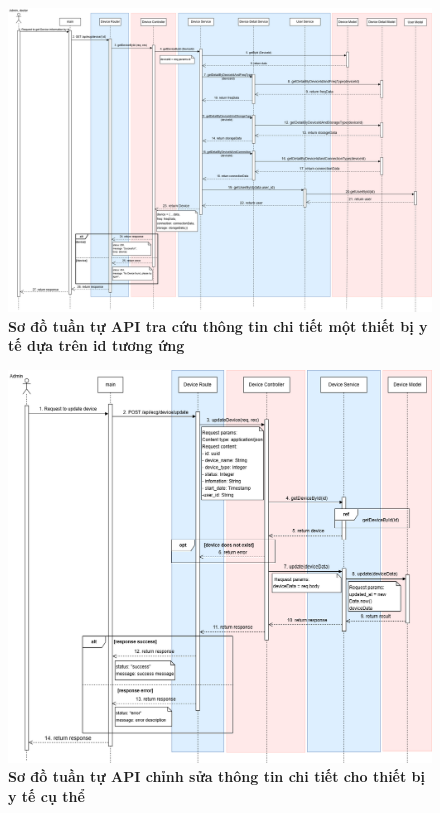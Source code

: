 \begin{figure}[H]
	\centering
	\includegraphics[width=16cm]{Images/api_sequence/device/device-GetDeviceById.drawio.png}
	\caption[Sơ đồ tuần tự API tra cứu thông tin chi tiết một thiết bị y tế dựa trên id tương ứng]{\bfseries \fontsize{12pt}{0pt}\selectfont Sơ đồ tuần tự API tra cứu thông tin chi tiết một thiết bị y tế dựa trên id tương ứng}
	\label{sequence_diagram_add_device}
\end{figure}

\begin{figure}[H]
	\centering
	\includegraphics[width=16cm]{Images/api_sequence/device/device-updateDevice.drawio.png}
	\caption[Sơ đồ tuần tự API chỉnh sửa thông tin chi tiết cho thiết bị y tế cụ thể]{\bfseries \fontsize{12pt}{0pt}\selectfont Sơ đồ tuần tự API chỉnh sửa thông tin chi tiết cho thiết bị y tế cụ thể}
	\label{sequence_diagram_update_device}
\end{figure}

